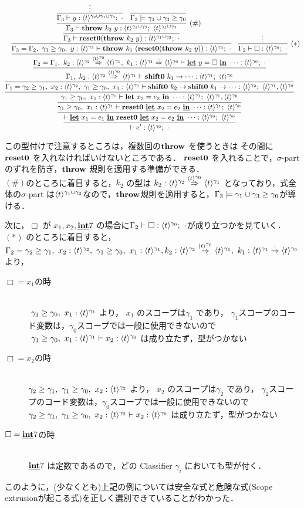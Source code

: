 \def\prooffive{
  \infer
  {\Gamma_3 \vdash \Resetz(\throw{k_2}{y}) : \tonethree; ~\cdot{}}
  {\infer[(\#)]
    {\Gamma_3 \vdash \throw{k_2}{y} : \tonethree;~\tonethree}
    {\infer{\Gamma_3 \vdash y :
      \codeT{t}{\gamma_2\uni\gamma_1\uni\gamma_3};~\cdot}{\vdots}
      & \infer{\Gamma_3 \models \longer{\gamma_1\uni\gamma_3}{\gamma_0}}{}
    }
  }
}

\[
  \proofone
\]

この型付けで注意するところは，複数回の$\textbf{throw}$ を使うときは その間に $\textbf{reset0}$ を入れなければいけないところである．
$\textbf{reset0}$ を入れることで，$\sigma$-part のずれを防ぎ，$\textbf{throw}$ 規則を適用する準備ができる．\\
$(\#)$のところに着目すると，$k_2$ の型は $k_2:{\langle{t}\rangle^{\gamma_2}} \stackrel{\langle{t}\rangle^{\gamma_0}}{\Rightarrow} {\langle{t}\rangle^{\gamma_1}}$ となっており，式全体の$\sigma$-part は$\langle{t}\rangle^{\gamma_1\cup\gamma_3}$なので，$\textbf{throw}$規則を適用すると，$\Gamma_3 \models {\gamma_1\cup\gamma_3} \ge {\gamma_0}$が導ける．

次に，$\Box$ が $x_1, x_2, \underline{\textbf{int}} 7$ の場合に$\Gamma_2 \vdash \Box : \langle{t}\rangle^{\gamma_0};~ \cdot$が成り立つかを見ていく．\\
$(*)$ のところに着目すると，
$\Gamma_2 = {\gamma_2} \ge {\gamma_1},~x_2:\langle{t}\rangle^{\gamma_2},~{\gamma_1} \ge {\gamma_0},~x_1:\langle{t}\rangle^{\gamma_1},k_2:{\langle{t}\rangle^{\gamma_2}} \stackrel{\langle{t}\rangle^{\gamma_0}}{\Rightarrow} {\langle{t}\rangle^{\gamma_1}},~k_1:{\langle{t}\rangle^{\gamma_1}} \stackrel{\cdot{}}{\Rightarrow} {\langle{t}\rangle^{\gamma_0}}$
より，
\begin{description}
\item[$\Box=x_1$の時]\mbox{}\\
  $~{\gamma_1} \ge {\gamma_0},~x_1:\langle{t}\rangle^{\gamma_1}$ より，
  $x_1$ のスコープは$\gamma_1$ であり，
  $\gamma_1$スコープのコード変数は，$\gamma_0$スコープでは一般に使用できないので
  $~{\gamma_1} \ge {\gamma_0},~x_1:\langle{t}\rangle^{\gamma_1} \vdash x_2:\langle{t}\rangle^{\gamma_0}$ は成り立たず，型がつかない
\item[$\Box=x_2$の時]\mbox{}\\
  ${\gamma_2} \ge {\gamma_1},~{\gamma_1} \ge {\gamma_0},~x_2:\langle{t}\rangle^{\gamma_2}$ より，
  $x_2$ のスコープは$\gamma_2$ であり，
  $\gamma_2$スコープのコード変数は，$\gamma_0$スコープでは一般に使用できないので
  ${\gamma_2} \ge {\gamma_1},~{\gamma_1} \ge {\gamma_0},~x_2:\langle{t}\rangle^{\gamma_2} \vdash x_2:\langle{t}\rangle^{\gamma_0}$ は成り立たず，型がつかない
\item[$\Box= \underline{\textbf{int}} 7$の時]\mbox{}\\
  $\underline{\textbf{int}} 7$ は定数であるので，どの Classifier $\gamma_i$ においても型が付く．
\end{description}

このように，(少なくとも)上記の例については安全な式と危険な式(Scope extrusionが起こる式)を正しく選別できていることがわかった．

